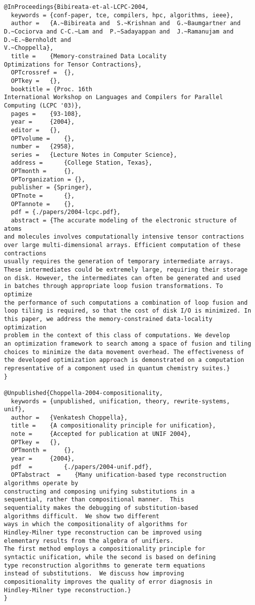 \documentclass[11pt]{article}
\begin{document}
\begin{lstlisting}
@InProceedings{Bibireata-et-al-LCPC-2004,
  keywords = {conf-paper, tce, compilers, hpc, algorithms, ieee},
  author = 	 {A.~Bibireata and  S.~Krishnan and  G.~Baumgartner and  D.~Cociorva and C-C.~Lam and  P.~Sadayappan and  J.~Ramanujam and  D.~E.~Bernholdt and
V.~Choppella},
  title = 	 {Memory-constrained Data Locality
Optimizations for Tensor Contractions},
  OPTcrossref =  {},
  OPTkey = 	 {},
  booktitle = {Proc. 16th
International Workshop on Languages and Compilers for Parallel
Computing (LCPC '03)},
  pages = 	 {93-108},
  year = 	 {2004},
  editor = 	 {},
  OPTvolume = 	 {},
  number = 	 {2958},
  series = 	 {Lecture Notes in Computer Science},
  address = 	 {College Station, Texas},
  OPTmonth = 	 {},
  OPTorganization = {},
  publisher = {Springer},
  OPTnote = 	 {},
  OPTannote = 	 {},
  pdf = {./papers/2004-lcpc.pdf},
  abstract = {The accurate modeling of the electronic structure of atoms
and molecules involves computationally intensive tensor contractions
over large multi-dimensional arrays. Efficient computation of these contractions
usually requires the generation of temporary intermediate arrays.
These intermediates could be extremely large, requiring their storage
on disk. However, the intermediates can often be generated and used
in batches through appropriate loop fusion transformations. To optimize
the performance of such computations a combination of loop fusion and
loop tiling is required, so that the cost of disk I/O is minimized. In
this paper, we address the memory-constrained data-locality optimization
problem in the context of this class of computations. We develop
an optimization framework to search among a space of fusion and tiling
choices to minimize the data movement overhead. The effectiveness of
the developed optimization approach is demonstrated on a computation
representative of a component used in quantum chemistry suites.}
}

@Unpublished{Choppella-2004-compositionality,
  keywords = {unpublished, unification, theory, rewrite-systems, unif},
  author = 	 {Venkatesh Choppella},
  title = 	 {A compositionality principle for unification},
  note = 	 {Accepted for publication at UNIF 2004},
  OPTkey = 	 {},
  OPTmonth = 	 {},
  year = 	 {2004},
  pdf  =         {./papers/2004-unif.pdf},
  OPTabstract  =    {Many unification-based type reconstruction algorithms operate by
constructing and composing unifying substitutions in a
sequential, rather than compositional manner.  This
sequentiality makes the debugging of substitution-based
algorithms difficult.  We show two different
ways in which the compositionality of algorithms for
Hindley-Milner type reconstruction can be improved using
elementary results from the algebra of unifiers.
The first method employs a compositionality principle for
syntactic unification, while the second is based on defining
type reconstruction algorithms to generate term equations
instead of substitutions.  We discuss how improving
compositionality improves the quality of error diagnosis in
Hindley-Milner type reconstruction.}
}


\end{lstlisting}
\end{document}
